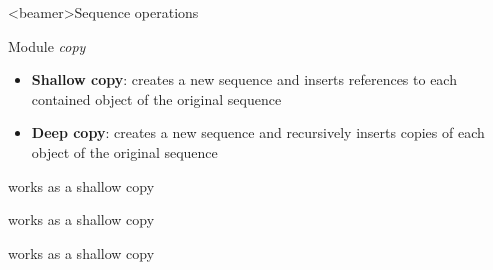 \begin{frame}<beamer>{Sequence operations}

   Module \textit{copy}

  \medskip

  \begin{itemize}
    \item<2-> \textbf{Shallow copy}: creates a new sequence and inserts references to each contained object of the original sequence
    \item<3-> \textbf{Deep copy}: creates a new sequence and recursively inserts copies of each object of the original sequence
  \end{itemize}

  \bigskip

    works as a shallow copy

    works as a shallow copy

    works as a shallow copy


\end{frame}


